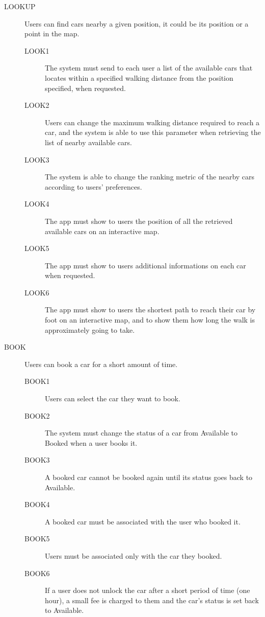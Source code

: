 \documentclass[11pt]{article} %
\begin{document}
\begin{description}
 	\item[LOOKUP] Users can find cars nearby a given position, it could be its position or a point in the map.
	\begin{description}
	\item[LOOK1] The system must send to each user a list of the available cars that locates within a specified walking distance from the position specified, when requested.
	\item[LOOK2] Users can change the maximum walking distance required to reach a car, and the system is able to use this parameter when retrieving the list of nearby available cars.
	\item[LOOK3] The system is able to change the ranking metric of the nearby cars according to users' preferences.
	\item[LOOK4] The app must show to users the position of all the retrieved available cars on an interactive map.
	\item[LOOK5] The app must show to users additional informations on each car when requested.
	\item[LOOK6] The app must show to users the shortest path to reach their car by foot on an interactive map, and to show them how long the walk is approximately going to take.
	\end{description}

 	\item[BOOK] Users can book a car for a short amount of time.
	\begin{description}
	\item[BOOK1] Users can select the car they want to book.
	\item[BOOK2] The system must change the status of a car from Available to Booked when a user books it.
	\item[BOOK3] A booked car cannot be booked again until its status goes back to Available.
	\item[BOOK4] A booked car must be associated with the user who booked it.
	\item[BOOK5] Users must be associated only with the car they booked.
	\item[BOOK6] If a user does not unlock the car after a short period of time (one hour), a small fee is charged to them and the car's status is set back to Available.
	\end{description}


\end{description}
\end{document}
